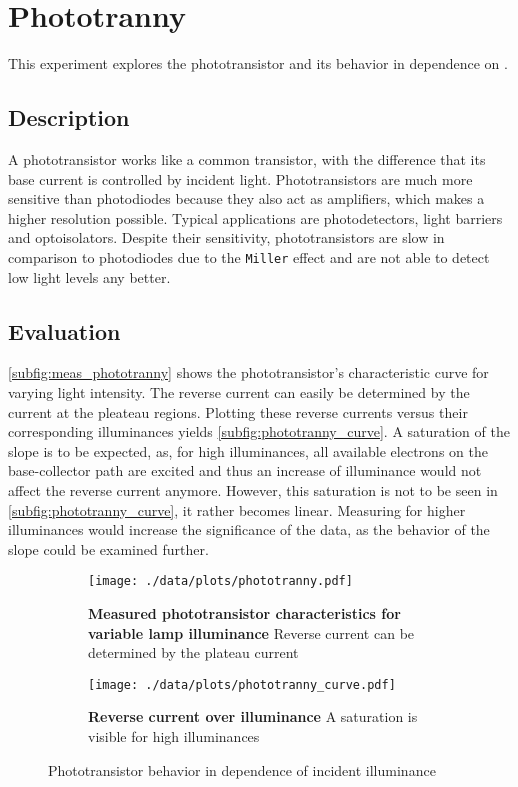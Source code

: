 \chapter{Phototranny}
This experiment explores the phototransistor and its behavior in dependence on .

\section{Description}
A phototransistor works like a common transistor, with the difference that its base current is controlled by incident light.
Phototransistors are much more sensitive than photodiodes because they also act as amplifiers, which makes a higher resolution possible.
Typical applications are photodetectors, light barriers and optoisolators.
Despite their sensitivity, phototransistors are slow in comparison to photodiodes due to the \texttt{Miller} effect and are not able to detect low light levels any better.

\section{Evaluation}
\autoref{subfig:meas_phototranny} shows the phototransistor's characteristic curve for varying light intensity.
The reverse current can easily be determined by the current at the pleateau regions.
Plotting these reverse currents versus their corresponding illuminances yields \autoref{subfig:phototranny_curve}.
A saturation of the slope is to be expected, as, for high illuminances, all available electrons on the base-collector path are excited and thus an increase of illuminance would not affect the reverse current anymore.
However, this saturation is not to be seen in \autoref{subfig:phototranny_curve}, it rather becomes linear.
Measuring for higher illuminances would increase the significance of the data, as the behavior of the slope could be examined further.

\begin{figure}[btp]
	\centering
	\begin{subfigure}{0.4\textwidth}
		\centering
		\texttt{[image: ./data/plots/phototranny.pdf]}
		\caption[Measured phototransistor characteristics for variable lamp illuminance]{\textbf{Measured phototransistor characteristics for variable lamp illuminance} Reverse current can be determined by the plateau current}
		\label{subfig:meas_phototranny}
	\end{subfigure}\quad
	\begin{subfigure}{0.4\textwidth}
		\centering
		\texttt{[image: ./data/plots/phototranny\_curve.pdf]}
		\caption[Reverse current over illuminance]{\textbf{Reverse current over illuminance} A saturation is visible for high illuminances}
		\label{subfig:phototranny_curve}
	\end{subfigure}
	\caption{Phototransistor behavior in dependence of incident illuminance}
\end{figure}
